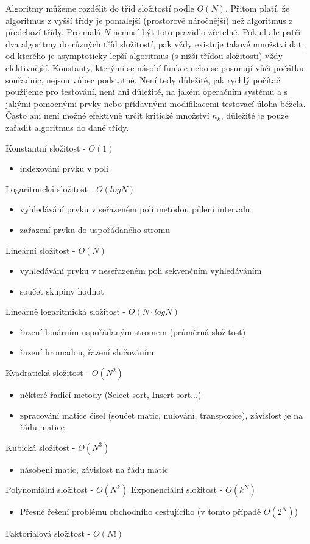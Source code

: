 \documentclass[12pt]{article}
\begin{document}
Algoritmy můžeme rozdělit do tříd složitostí podle $O(N)$. Přitom platí, že algoritmus z vyšší třídy je pomalejší (prostorově náročnější) než algoritmus z předchozí třídy.
\newline
\indent
Pro malá $N$ nemusí být toto pravidlo zřetelné. Pokud ale patří dva algoritmy do různých tříd složitostí, pak vždy existuje takové množství dat, od kterého je asymptoticky lepší algoritmus (s nižší třídou složitosti) vždy efektivnější.
\newline
\indent
Konstanty, kterými se násobí funkce nebo se posunují vůči počátku souřadnic, nejsou vůbec podstatné. Není tedy důležité, jak rychlý počítač použijeme pro testování, není ani důležité, na jakém operačním systému a s jakými pomocnými prvky nebo přídavnými modifikacemi testovací úloha běžela. Často ani není možné efektivně určit kritické množství $n_k$, důležité je pouze zařadit algoritmus do dané třídy. \citep{rybicka}

Konstantní složitost - $O(1)$
\begin{itemize}
\item indexování prvku v poli
\end{itemize}
Logaritmická složitost - $O(log N)$
\begin{itemize}
\item vyhledávání prvku v seřazeném poli metodou půlení intervalu
\item zařazení prvku do uspořádaného stromu
\end{itemize}
Lineární složitost - $O(N)$
\begin{itemize}
\item vyhledávání prvku v neseřazeném poli sekvenčním vyhledáváním
\item součet skupiny hodnot
\end{itemize}
Lineárně logaritmická složitost - $O(N \cdot logN)$
\begin{itemize}
\item řazení binárním uspořádaným stromem (průměrná složitost)
\item řazení hromadou, řazení slučováním
\end{itemize}
Kvadratická složitost - $O(N^2)$
\begin{itemize}
\item některé řadicí metody (Select sort, Insert sort...)
\item zpracování matice čísel (součet matic, nulování, transpozice), závislost je na řádu matice
\end{itemize}
Kubická složitost - $O(N^3)$
\begin{itemize}
\item násobení matic, závislost na řádu matic
\end{itemize}
Polynomiální složitost - $O(N^k)$
Exponenciální složitost - $O(k^N)$
\begin{itemize}
\item Přesné řešení problému obchodního cestujícího (v tomto případě $O(2^N)$)
\end{itemize}
Faktoriálová složitost - $O(N!)$
\newline
\newline
\end{document}
